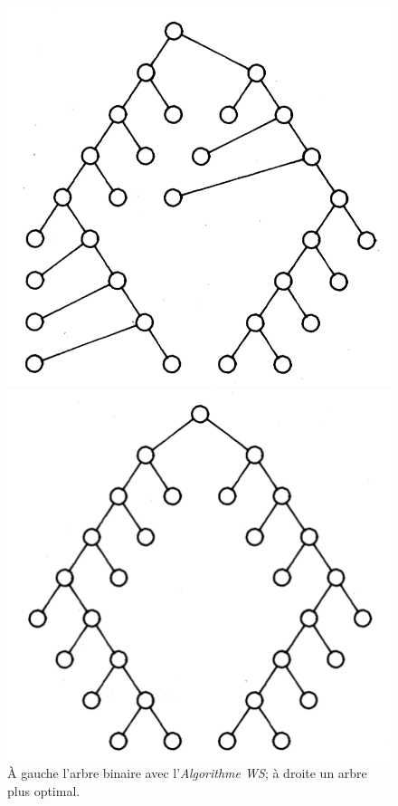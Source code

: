 \documentclass{article}
\begin{document}
  \vfill
  \begin{figure}[h]
      \begin{center}
        \begin{left}
          \includegraphics[scale=0.4]{arbreWSM.png}
        \end{left}
        \begin{right}
          \includegraphics[scale=0.4]{arbreMirror.png}
        \end{right}
      \end{center}
    \caption{À gauche l'arbre binaire avec l'\emph{Algorithme WS}; à droite un arbre plus optimal. \cite{article81}}
    \label{fig:arbresWSMirror}
  \end{figure}
  \vfill
\end{document}
